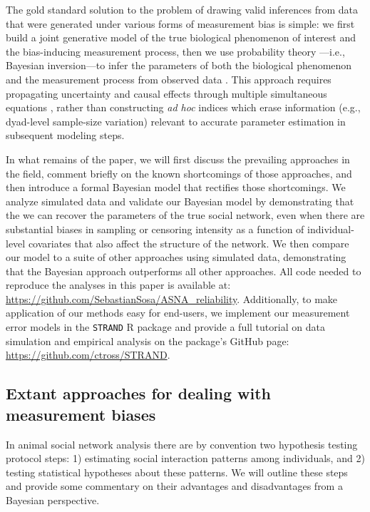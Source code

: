 \documentclass[Afour,sageh,times]{sagej}
\begin{document}
 The gold standard solution to the problem of drawing valid inferences from data that were generated under various forms of measurement bias is simple: we first build a joint generative model of the true biological phenomenon of interest and the bias-inducing measurement process, then we use probability theory \citep{jaynes2003probability}---i.e., Bayesian inversion---to infer the parameters of both the biological phenomenon and the measurement process from observed data \citep{ross2022modelling}. This approach requires propagating uncertainty and causal effects through multiple simultaneous equations \citep{mcelreath2018statistical}, rather than constructing \emph{ad hoc} indices which erase information (e.g., dyad-level sample-size variation) relevant to accurate parameter estimation in subsequent modeling steps. 

In what remains of the paper, we will first discuss the prevailing approaches in the field, comment briefly on the known shortcomings of those approaches, and then introduce a formal Bayesian model that rectifies those shortcomings. We analyze simulated data and validate our Bayesian model by demonstrating that the we can recover the parameters of the true social network, even when there are substantial biases in sampling or censoring intensity as a function of individual-level covariates that also affect the structure of the network. We then compare our model to a suite of other approaches using simulated data, demonstrating that the Bayesian approach outperforms all other approaches. All code needed to reproduce the analyses in this paper is available at: \url{https://github.com/SebastianSosa/ASNA_reliability}. Additionally, to make application of our methods easy for end-users, we implement our measurement error models in the \texttt{STRAND} R package and provide a full tutorial on data simulation and empirical analysis on the package's GitHub page: \url{https://github.com/ctross/STRAND}. 

\subsection{Extant approaches for dealing with measurement biases}
In animal social network analysis there are by convention two hypothesis testing protocol steps: 1) estimating social interaction patterns among individuals, and 2) testing statistical hypotheses about these patterns. We will outline these steps and provide some commentary on their advantages and disadvantages from a Bayesian perspective. 
\end{document}
